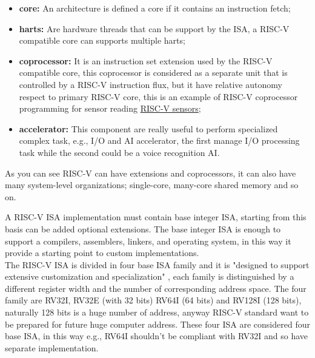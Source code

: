 {{	    \begin{itemize}
	        \item \textbf{core:} An architecture is defined a core if it contains an instruction fetch; 
	        \item \textbf{harts:} Are hardware threads that can be support by the ISA, a RISC-V compatible core can supports multiple harts;
	        \item \textbf{coprocessor:} It is an instruction set extension used by the RISC-V compatible core, this coprocessor is considered as a separate unit that is controlled by a RISC-V instruction flux, but it have relative autonomy respect to primary RISC-V core, this is an example of RISC-V coprocessor programming for sensor reading \href{https://github.com/espressif/esp-idf/blob/c13afea635adec735435961270d0894ff46eef85/docs/en/api-guides/ulp-risc-v.rst}{RISC-V sensors};
	        \item \textbf{accelerator:} This component are really useful to perform specialized complex task, e.g., I/O and AI accelerator, the first manage I/O processing task while the second could be a voice recognition AI.
	    \end{itemize}
	    As you can see RISC-V can have extensions and coprocessors, it can also have many system-level organizations; single-core, many-core shared memory and so on.
	    
	    
	    A RISC-V ISA implementation must contain base integer ISA, starting from this basis can be added optional extensions. 
	    The base integer ISA is enough to support a compilers, assemblers, linkers, and operating system, in this way it provide a starting point to custom implementations.\\
	    
	    The RISC-V ISA is divided in four base ISA family and it is "designed to support extensive customization and specialization" , each family is distinguished by a different register width and the number of corresponding address space. 
	    The four family are RV32I, RV32E (with 32 bits) RV64I (64 bits) and RV128I (128 bits), naturally 128 bits is a huge number of address, anyway RISC-V standard want to be prepared for future huge computer address. These four ISA are considered four base ISA, in this way e.g., RV64I shouldn't be compliant with RV32I and so have separate implementation.\\
	     
}}
